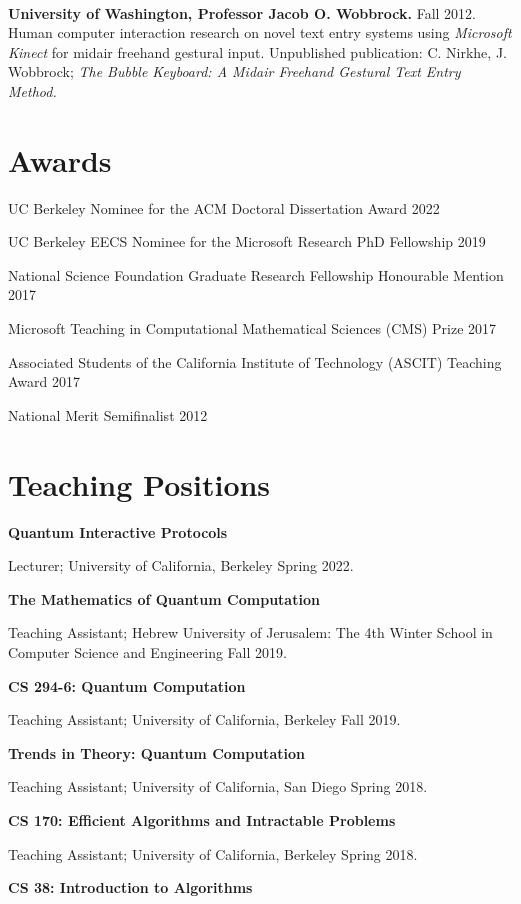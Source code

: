\documentclass[11pt]{article}
\begin{document}
\

\textbf{University of Washington, Professor Jacob O. Wobbrock.}
Fall 2012. Human computer interaction research on novel text entry systems using \emph{Microsoft Kinect} for midair freehand gestural input. Unpublished publication: C. Nirkhe, J. Wobbrock; \emph{The Bubble Keyboard: A Midair Freehand Gestural Text Entry Method.}

\section{Awards}
UC Berkeley Nominee for the ACM Doctoral Dissertation Award 2022

UC Berkeley EECS Nominee for the Microsoft Research PhD Fellowship 2019

National Science Foundation Graduate Research Fellowship Honourable Mention 2017 

Microsoft Teaching in Computational Mathematical Sciences (CMS) Prize 2017

Associated Students of the California Institute of Technology (ASCIT) Teaching Award 2017 

National Merit Semifinalist 2012 \\

\section{Teaching Positions}

\textbf{Quantum Interactive Protocols}

Lecturer; University of California, Berkeley Spring 2022.

\textbf{The Mathematics of Quantum Computation}

Teaching Assistant; Hebrew University of Jerusalem: The 4th Winter School in Computer Science and Engineering Fall 2019.

\textbf{CS 294-6: Quantum Computation}

Teaching Assistant; University of California, Berkeley Fall 2019.

\textbf{Trends in Theory: Quantum Computation}

Teaching Assistant; University of California, San Diego Spring 2018.

\textbf{CS 170: Efficient Algorithms and Intractable Problems}

Teaching Assistant; University of California, Berkeley Spring 2018.

\textbf{CS 38: Introduction to Algorithms}
\end{document}
